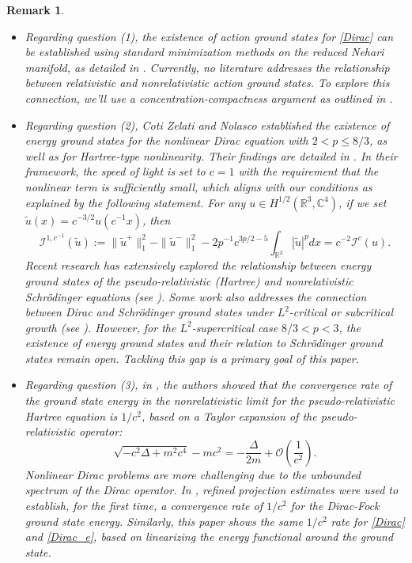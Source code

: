 \documentclass{amsart}
\theoremstyle{plain}
\newtheorem{remark}[theorem]{Remark}
\theoremstyle{definition}
\theoremstyle{remark}
\numberwithin{equation}{section} \numberwithin{figure}{section}
\begin{document}
 \begin{remark}
     \begin{itemize}
         \item[(a)] Regarding question (1), the existence of action ground states for \eqref{Dirac} can be established using standard minimization methods on the reduced Nehari manifold, as detailed in \cite{dyh}. Currently, no literature addresses the relationship between relativistic and nonrelativistic action ground states. To explore this connection, we'll use a concentration-compactness argument as outlined in \cite{MR778970}.
         
         \item[(b)] Regarding question (2), Coti Zelati and Nolasco established the existence of energy ground states for the nonlinear Dirac equation with $2<p\leq 8/3$, as well as for Hartree-type nonlinearity. Their findings are detailed in \cite{CN19, CN25, Nolasco}. In their framework, the speed of light is set to \(c=1\) with the requirement that the nonlinear term is sufficiently small, which aligns with our conditions as explained by the following statement. For any $u\in H^{1/2}(\mathbb{R}^3, \mathbb{C}^4)$, if we set $\tilde{u}(x)=c^{-3/2}u(c^{-1}x)$, then $$\mathcal{I}^{1,c^{-1}}(\tilde{u}):=\|\tilde{u}^+\|^2_1-\|\tilde{u}^-\|_1^2-2p^{-1}c^{3p/2-5}\int_{\mathbb{R}^3 } |\tilde{u}|^p dx=c^{-2} \mathcal{I}^c(u). $$  
         Recent research has extensively explored the relationship between energy ground states of the pseudo-relativistic (Hartree) and nonrelativistic Schr\"odinger equations (see \cite{arXiv:2505.05917, MR4430585, MR2561169}). Some work also addresses the connection between Dirac and Schr\"odinger ground states under $L^2$-critical or subcritical growth (see \cite{CDGW24, Dolbeault24, ES01}). However, for the $L^2$-supercritical case $8/3 < p < 3$, the existence of energy ground states and their relation to Schr\"odinger ground states remain open. Tackling this gap is a primary goal of this paper.  
         
         \item[(c)] Regarding question (3), in \cite{arXiv:2505.05917}, the authors showed that the convergence rate of the ground state energy in the nonrelativistic limit for the pseudo-relativistic Hartree equation is $1/c^2$, based on a Taylor expansion of the pseudo-relativistic operator: \[\sqrt{-c^2\Delta+m^2c^4}-mc^2=-\frac{\Delta}{2m}+ \mathcal{O}\left(\frac{1}{c^2}\right).\]  
         Nonlinear Dirac problems are more challenging due to the unbounded spectrum of the Dirac operator. In \cite{arXiv:2503.21405}, refined projection estimates were used to establish, for the first time, a convergence rate of \(1/c^2\) for the Dirac-Fock ground state energy. Similarly, this paper shows the same \(1/c^2\) rate for \eqref{Dirac} and \eqref{Dirac_e}, based on linearizing the energy functional around the ground state.


\end{itemize}
\end{remark}
\end{document}
